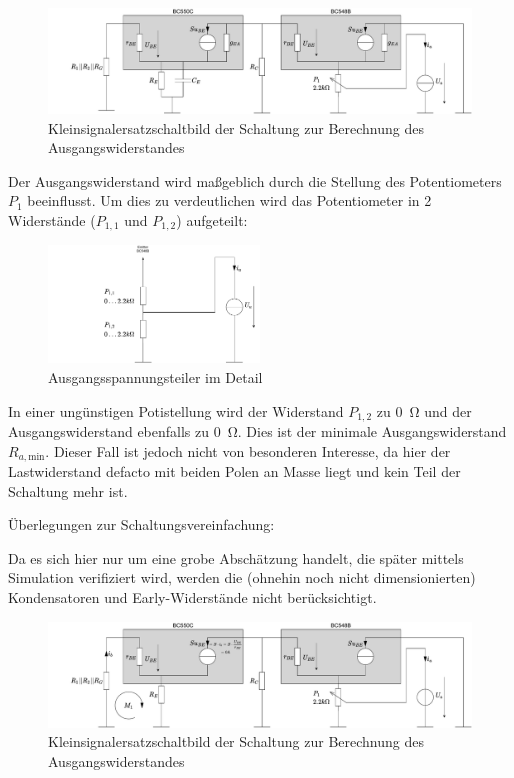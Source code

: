 \begin{figure}[H]
    \centering
    \includegraphics[width = \textwidth]{tex/1_Microphone/pictures/KSESB_ra.pdf}
    \caption{Kleinsignalersatzschaltbild der Schaltung zur Berechnung des Ausgangswiderstandes}
    \label{fig:my_label}
\end{figure}

Der Ausgangswiderstand wird maßgeblich durch die Stellung des Potentiometers $P_1$ beeinflusst. Um dies zu verdeutlichen wird das Potentiometer in 2 Widerstände ($P_{1,1}$ und $P_{1,2}$) aufgeteilt:

\begin{figure}[H]
    \centering
    \includegraphics[width = 0.5\textwidth]{tex/1_Microphone/pictures/ra_spannungsteiler.pdf}
    \caption{Ausgangsspannungsteiler im Detail}
    \label{fig:my_label}
\end{figure}

In einer ungünstigen Potistellung wird der Widerstand $P_{1,2}$ zu \SI{0}{\ohm} und der Ausgangswiderstand ebenfalls zu \SI{0}{\ohm}. Dies ist der minimale Ausgangswiderstand $R_{a,\text{min}}$. Dieser Fall ist jedoch nicht von besonderen Interesse, da hier der Lastwiderstand defacto mit beiden Polen an Masse liegt und kein Teil der Schaltung mehr ist.

Überlegungen zur Schaltungsvereinfachung:

Da es sich hier nur um eine grobe Abschätzung handelt, die später mittels Simulation verifiziert wird, werden die (ohnehin noch nicht dimensionierten) Kondensatoren und Early-Widerstände nicht berücksichtigt.

\begin{figure}[H]
    \centering
    \includegraphics[width = \textwidth]{tex/1_Microphone/pictures/KSESB_simplified.pdf}
    \caption{Kleinsignalersatzschaltbild der Schaltung zur Berechnung des Ausgangswiderstandes}
    \label{fig:my_label}
\end{figure}

